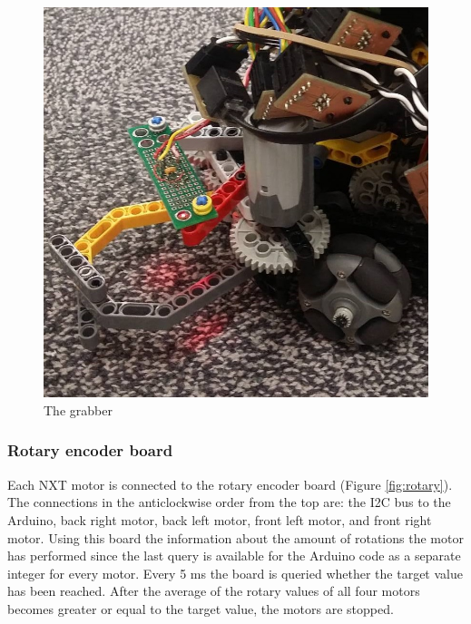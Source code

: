 \documentclass[a4paper,12pt]{article}
\begin{document}
\begin{figure}
\centering
\includegraphics[scale=.3]{grabber_close.jpg}
\caption{The grabber}
\label{fig:grabber}
\end{figure}

\subsubsection{Rotary encoder board}

Each NXT motor is connected to the rotary encoder board (Figure \ref{fig:rotary}). The connections in the anticlockwise order from the top are: the I2C bus to the Arduino, back right motor, back left motor, front left motor, and front right motor. Using this board the information about the amount of rotations the motor has performed since the last query is available for the Arduino code as a separate integer for every motor. Every 5 ms the board is queried whether the target value has been reached. After the average of the rotary values of all four motors becomes greater or equal to the target value, the motors are stopped.
\end{document}
